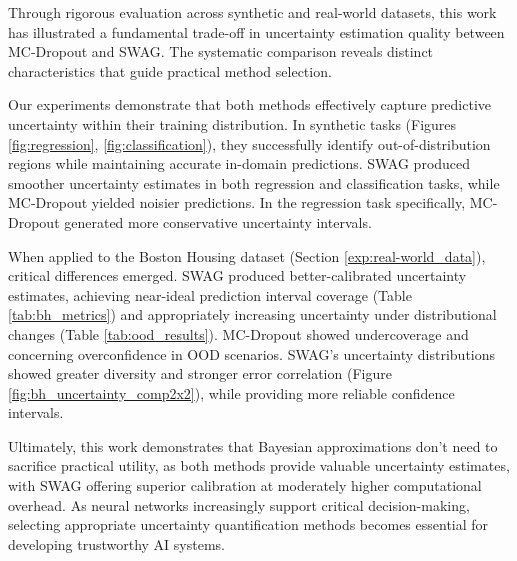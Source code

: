 
Through rigorous evaluation across synthetic and real-world datasets, this work has illustrated a
fundamental trade-off in uncertainty estimation quality between MC-Dropout and SWAG. The systematic
comparison reveals distinct characteristics that guide practical method selection.

\vspace{0.15cm}
Our experiments demonstrate that both methods effectively capture predictive uncertainty within their
training distribution. In synthetic tasks (Figures \ref{fig:regression}, \ref{fig:classification}),
they successfully identify out-of-distribution regions while maintaining accurate in-domain predictions.
SWAG produced smoother uncertainty estimates in both regression and classification tasks, while MC-Dropout
yielded noisier predictions. In the regression task specifically, MC-Dropout generated more conservative
uncertainty intervals.

When applied to the Boston Housing dataset (Section \ref{exp:real-world_data}), critical differences
emerged. SWAG produced better-calibrated uncertainty estimates, achieving near-ideal prediction interval
coverage (Table \ref{tab:bh_metrics}) and appropriately increasing uncertainty under distributional changes
(Table \ref{tab:ood_results}). MC-Dropout showed undercoverage and concerning overconfidence in OOD
scenarios. SWAG's uncertainty distributions showed greater diversity and stronger error correlation
(Figure \ref{fig:bh_uncertainty_comp2x2}), while providing more reliable confidence intervals.

\vspace{0.15cm}
Ultimately, this work demonstrates that Bayesian approximations don't need to sacrifice practical utility,
as both methods provide valuable uncertainty estimates, with SWAG offering superior calibration at
moderately higher computational overhead. As neural networks increasingly support critical decision-making,
selecting appropriate uncertainty quantification methods becomes essential for developing trustworthy AI
systems.

